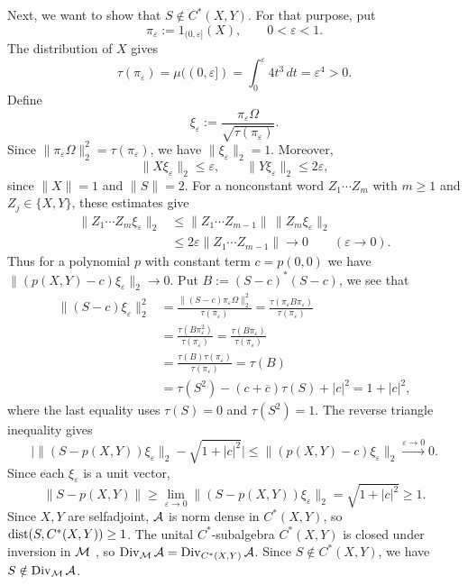 \begin{example}
Next, we want to show that $S\notin C^*(X,Y)$.
For that purpose, put
\[
 \pi_\varepsilon:=1_{(0,\varepsilon]}(X),\qquad 0<\varepsilon<1.
\]
The distribution of $X$ gives
\[
 \tau(\pi_\varepsilon)=\mu((0,\varepsilon])
 =\int_0^\varepsilon 4t^3\,dt=\varepsilon^4>0.
\]
Define
\[
 \xi_\varepsilon:=\frac{\pi_\varepsilon\Omega}{\sqrt{\tau(\pi_\varepsilon)}}.
\]
Since $\|\pi_\varepsilon\Omega\|_2^2=\tau(\pi_\varepsilon)$, we have $\|\xi_\varepsilon\|_2=1$.
Moreover,
\[
 \|X\xi_\varepsilon\|_2\leq\varepsilon,\qquad
 \|Y\xi_\varepsilon\|_2\leq 2\varepsilon,
\]
since $\|X\|=1$ and $\|S\|=2$.
For a nonconstant word $Z_1\cdots Z_m$ with $m\geq1$ and $Z_j\in\{X,Y\}$, these estimates give
\[
 \begin{aligned}
 \|Z_1\cdots Z_m\xi_\varepsilon\|_2
 &\leq\|Z_1\cdots Z_{m-1}\|\,\|Z_m\xi_\varepsilon\|_2\\
 &\leq2\varepsilon\|Z_1\cdots Z_{m-1}\|
 \longrightarrow0\qquad(\varepsilon\rightarrow0).
 \end{aligned}
\]
Thus for a polynomial $p$ with constant term $c=p(0,0)$ we have $\|(p(X,Y)-c)\xi_\varepsilon\|_2\to0$.
Put $B:=(S-c)^*(S-c)$, we see that
\[
 \begin{aligned}
 \|(S-c)\xi_\varepsilon\|_2^2
 &=\frac{\|(S-c)\pi_\varepsilon\Omega\|_2^2}{\tau(\pi_\varepsilon)}
 =\frac{\tau(\pi_\varepsilon B\pi_\varepsilon)}{\tau(\pi_\varepsilon)}\\
 &=\frac{\tau(B\pi_\varepsilon^2)}{\tau(\pi_\varepsilon)}
 =\frac{\tau(B\pi_\varepsilon)}{\tau(\pi_\varepsilon)}\\
 &=\frac{\tau(B)\tau(\pi_\varepsilon)}{\tau(\pi_\varepsilon)}
 =\tau(B)\\
 &=\tau(S^2)-(c+\overline{c})\tau(S)+|c|^2
 =1+|c|^2,
 \end{aligned}
\]
where the last equality uses $\tau(S)=0$ and $\tau(S^2)=1$.
The reverse triangle inequality gives
\[
 \bigl|\|(S-p(X,Y))\xi_\varepsilon\|_2-\sqrt{1+|c|^2}\bigr|
 \leq\|(p(X,Y)-c)\xi_\varepsilon\|_2
 \xrightarrow{\varepsilon\rightarrow0}0.
\]
Since each $\xi_\varepsilon$ is a unit vector,
\[
 \|S-p(X,Y)\|\geq\lim_{\varepsilon\rightarrow0}\|(S-p(X,Y))\xi_\varepsilon\|_2=\sqrt{1+|c|^2}\geq1.
\]
Since $X,Y$ are selfadjoint, $\mathcal A$ is norm dense in $C^*(X,Y)$, so $\operatorname{dist}(S,C^*(X,Y))\geq1$.
The unital $C^*$-subalgebra $C^*(X,Y)$ is closed under inversion in $\mathcal M$ \cite[Corollary~II.1.6.7]{Bla06}, so $\operatorname{Div}_{\mathcal M}\mathcal A=\operatorname{Div}_{C^*(X,Y)}\mathcal A$.
Since $S\notin C^*(X,Y)$, we have $S\notin\operatorname{Div}_{\mathcal M}\mathcal A$.


\end{example}
